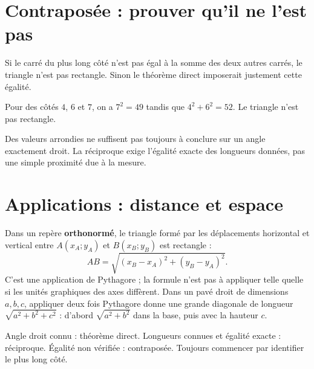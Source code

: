 \documentclass[../cours_3e.tex]{subfiles}
\begin{document}
\section{Contraposée : prouver qu'il ne l'est pas}
Si le carré du plus long côté n'est pas égal à la somme des deux autres carrés, le triangle n'est pas rectangle. Sinon le théorème direct imposerait justement cette égalité.
\begin{exemple}
Pour des côtés $4$, $6$ et $7$, on a $7^2=49$ tandis que $4^2+6^2=52$. Le triangle n'est pas rectangle.
\end{exemple}
\begin{attention}
Des valeurs arrondies ne suffisent pas toujours à conclure sur un angle exactement droit. La réciproque exige l'égalité exacte des longueurs données, pas une simple proximité due à la mesure.
\end{attention}
\section{Applications : distance et espace}
Dans un repère \textbf{orthonormé}, le triangle formé par les déplacements horizontal et vertical entre $A(x_A;y_A)$ et $B(x_B;y_B)$ est rectangle :
\[AB=\sqrt{(x_B-x_A)^2+(y_B-y_A)^2}.\]
C'est une application de Pythagore ; la formule n'est pas à appliquer telle quelle si les unités graphiques des axes diffèrent.
Dans un pavé droit de dimensions $a,b,c$, appliquer deux fois Pythagore donne une grande diagonale de longueur $\sqrt{a^2+b^2+c^2}$ : d'abord $\sqrt{a^2+b^2}$ dans la base, puis avec la hauteur $c$.
\begin{retenir}
Angle droit connu : théorème direct. Longueurs connues et égalité exacte : réciproque. Égalité non vérifiée : contraposée. Toujours commencer par identifier le plus long côté.
\end{retenir}
\end{document}
